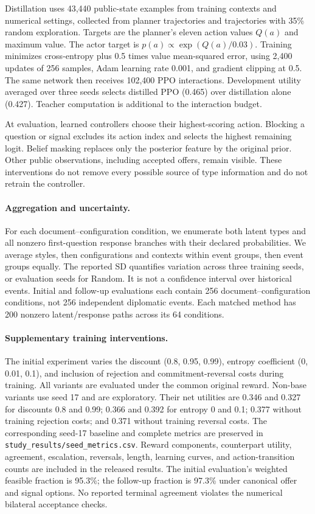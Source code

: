 Distillation uses 43,440 public-state examples from training contexts and numerical settings, collected from planner trajectories and trajectories with 35\% random exploration. Targets are the planner's eleven action values $Q(a)$ and maximum value. The actor target is $p(a)\propto\exp(Q(a)/0.03)$. Training minimizes cross-entropy plus 0.5 times value mean-squared error, using 2,400 updates of 256 samples, Adam learning rate 0.001, and gradient clipping at 0.5. The same network then receives 102,400 PPO interactions. Development utility averaged over three seeds selects distilled PPO (0.465) over distillation alone (0.427). Teacher computation is additional to the interaction budget.

At evaluation, learned controllers choose their highest-scoring action. Blocking a question or signal excludes its action index and selects the highest remaining logit. Belief masking replaces only the posterior feature by the original prior. Other public observations, including accepted offers, remain visible. These interventions do not remove every possible source of type information and do not retrain the controller.

\paragraph{Aggregation and uncertainty.}
For each document--configuration condition, we enumerate both latent types and all nonzero first-question response branches with their declared probabilities. We average styles, then configurations and contexts within event groups, then event groups equally. The reported SD quantifies variation across three training seeds, or evaluation seeds for Random. It is not a confidence interval over historical events. Initial and follow-up evaluations each contain 256 document--configuration conditions, not 256 independent diplomatic events. Each matched method has 200 nonzero latent/response paths across its 64 conditions.

\paragraph{Supplementary training interventions.}
The initial experiment varies the discount (0.8, 0.95, 0.99), entropy coefficient (0, 0.01, 0.1), and inclusion of rejection and commitment-reversal costs during training. All variants are evaluated under the common original reward. Non-base variants use seed 17 and are exploratory. Their net utilities are 0.346 and 0.327 for discounts 0.8 and 0.99; 0.366 and 0.392 for entropy 0 and 0.1; 0.377 without training rejection costs; and 0.371 without training reversal costs. The corresponding seed-17 baseline and complete metrics are preserved in \texttt{study\_results/seed\_metrics.csv}. Reward components, counterpart utility, agreement, escalation, reversals, length, learning curves, and action-transition counts are included in the released results. The initial evaluation's weighted feasible fraction is 95.3\%; the follow-up fraction is 97.3\% under canonical offer and signal options. No reported terminal agreement violates the numerical bilateral acceptance checks.

